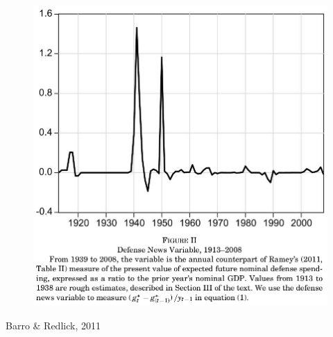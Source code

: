 \documentclass{beamer}
\begin{document}
\begin{frame}
  \begin{figure}
    \includegraphics[scale=.5]{barro_redlick2.eps}
  \end{figure}
  Barro \& Redlick, 2011
\end{frame}
\end{document}
